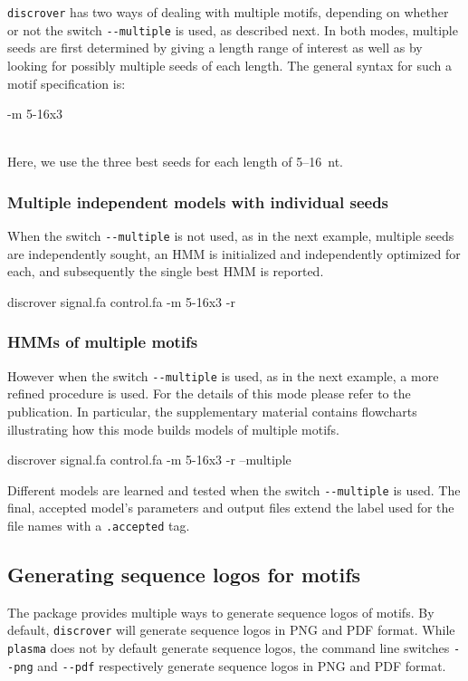 \documentclass[a4paper]{article}
\newcommand{\discrover}[0]{\texttt{discrover}}
\begin{document}
\discrover{} has two ways of dealing with multiple motifs, depending on whether or not the switch \verb|--multiple| is used, as described next.
In both modes, multiple seeds are first determined by giving a length range of interest as well as by looking for possibly multiple seeds of each length.
The general syntax for such a motif specification is:\\
\begin{verbbox}
-m 5-16x3
\end{verbbox}
\fbox{\theverbbox[t]}\\
Here, we use the three best seeds for each length of 5--16~nt.

\subsubsection{Multiple independent models with individual seeds}
When the switch \verb|--multiple| is not used, as in the next example, multiple seeds are independently sought, an HMM is initialized and independently optimized for each, and subsequently the single best HMM is reported.\\
\begin{verbbox}
discrover signal.fa control.fa -m 5-16x3 -r
\end{verbbox}
\fbox{\theverbbox[t]}

\subsubsection{HMMs of multiple motifs}
However when the switch \verb|--multiple| is used, as in the next example, a more refined procedure is used.
For the details of this mode please refer to the publication.
In particular, the supplementary material contains flowcharts illustrating how this mode builds models of multiple motifs.\\
\begin{verbbox}
discrover signal.fa control.fa -m 5-16x3 -r --multiple
\end{verbbox}
\fbox{\theverbbox[t]}

Different models are learned and tested when the switch \verb|--multiple| is used.
The final, accepted model's parameters and output files extend the label used for the file names with a \verb|.accepted| tag.

\subsection{Generating sequence logos for motifs}
The package provides multiple ways to generate sequence logos of motifs.
By default, \verb|discrover| will generate sequence logos in PNG and PDF format.
While \verb|plasma| does not by default generate sequence logos, the command line switches \verb|--png| and \verb|--pdf| respectively generate sequence logos in PNG and PDF format.
\end{document}
